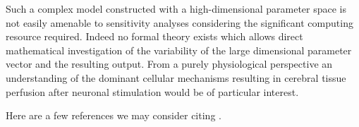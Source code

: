 Such a complex model constructed with a high-dimensional parameter space is not easily amenable to sensitivity analyses considering the significant computing resource required. Indeed no formal theory exists which allows direct mathematical investigation of the variability of the large dimensional parameter vector and the resulting output. 
From a purely physiological perspective an understanding of the dominant cellular mechanisms resulting in cerebral tissue perfusion after neuronal stimulation would be of particular interest.
  
  
Here are a few references we may consider citing  \cite{gsa_pharm,lr_gsa,uqpy,Witthoft2013}.
